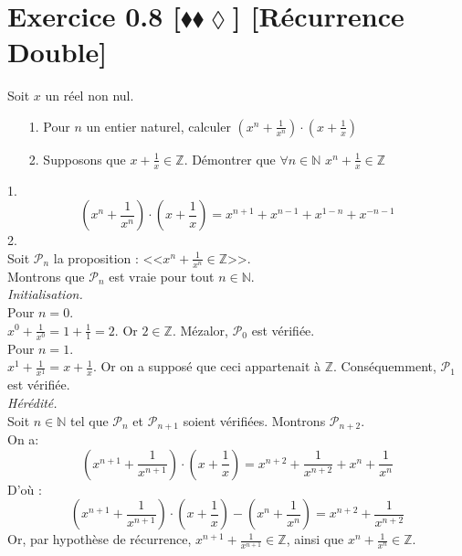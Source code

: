 \documentclass[10pt]{article}
\begin{document}
\section*{Exercice 0.8 [$\blacklozenge\blacklozenge\lozenge$] [Récurrence Double]}
\begin{tcolorbox}[enhanced, width=6in, center, size=fbox, fontupper=\large, drop shadow southwest]
    Soit $x$ un réel non nul.
    \begin{itemize}
        \item[1.] Pour $n$ un entier naturel, calculer $(x^n+\frac{1}{x^n})\cdot(x+\frac{1}{x})$
        \item[2.] Supposons que $x+\frac{1}{x}\in\mathbb{Z}$. Démontrer que $\forall n\in\mathbb{N}$ $x^n + \frac{1}{x}\in\mathbb{Z}$ 
    \end{itemize}
    1.
    \begin{equation*}
        (x^n + \frac{1}{x^n})\cdot(x+\frac{1}{x}) = x^{n+1}+x^{n-1}+x^{1-n}+x^{-n-1}
    \end{equation*}
    2.\\
    Soit $\mathcal{P}_n$ la proposition : <<$x^n+\frac{1}{x^n}\in\mathbb{Z}$>>.\\
    Montrons que $\mathcal{P}_n$ est vraie pour tout $n\in\mathbb{N}$.\\
    \emph{Initialisation.}\\
    Pour $n=0$.\\
    $x^0 + \frac{1}{x^0} = 1 + \frac{1}{1} = 2$. Or $2\in\mathbb{Z}$. Mézalor, $\mathcal{P}_0$ est vérifiée.\\
    Pour $n=1$.\\
    $x^1 + \frac{1}{x^1} = x + \frac{1}{x}$. Or on a supposé que ceci appartenait à $\mathbb{Z}$. Conséquemment, $\mathcal{P}_1$ est vérifiée.\\[0.5cm]
    \emph{Hérédité.}\\
    Soit $n\in\mathbb{N}$ tel que $\mathcal{P}_n$ et $\mathcal{P}_{n+1}$ soient vérifiées. Montrons $\mathcal{P}_{n+2}$.\\
    On a:
    \begin{equation*}
        (x^{n+1}+\frac{1}{x^{n+1}})\cdot(x+\frac{1}{x})=x^{n+2}+\frac{1}{x^{n+2}}+x^n+\frac{1}{x^{n}}
    \end{equation*}
    D'où :
    \begin{equation*}
        (x^{n+1}+\frac{1}{x^{n+1}})\cdot(x+\frac{1}{x})-(x^n+\frac{1}{x^n}) = x^{n+2}+\frac{1}{x^{n+2}}
    \end{equation*}
    Or, par hypothèse de récurrence, $x^{n+1}+\frac{1}{x^{n+1}}\in\mathbb{Z}$, ainsi que $x^n+\frac{1}{x^n}\in\mathbb{Z}$.\\

\end{tcolorbox}
\end{document}
